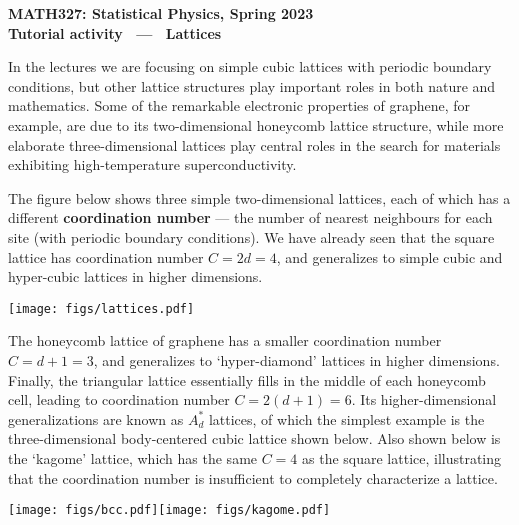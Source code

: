\documentclass[12 pt]{article} %
\begin{document}
\newcommand{\thisunit}{MATH327 Tutorial (Lattice)}
\newcommand{\moddate}{Last modified 4 May 2023}
\begin{center}
  {\Large \textbf{MATH327: Statistical Physics, Spring 2023}} \\[12 pt]
  {\Large \textbf{Tutorial activity \ --- \ Lattices}} \\[24 pt]
\end{center}

In the lectures we are focusing on simple cubic lattices with periodic boundary conditions, but other lattice structures play important roles in both nature and mathematics.
Some of the remarkable electronic properties of graphene, for example, are due to its two-dimensional honeycomb lattice structure, while more elaborate three-dimensional lattices play central roles in the search for materials exhibiting high-temperature superconductivity.

The figure below shows three simple two-dimensional lattices, each of which has a different \textbf{coordination number} --- the number of nearest neighbours for each site (with periodic boundary conditions). %
We have already seen that the square lattice has coordination number $C = 2d = 4$, and generalizes to simple cubic and hyper-cubic lattices in higher dimensions.

\begin{center}\texttt{[image: figs/lattices.pdf]}\end{center}

The honeycomb lattice of graphene has a smaller coordination number $C = d + 1 = 3$, and generalizes to `hyper-diamond' lattices in higher dimensions.
Finally, the triangular lattice essentially fills in the middle of each honeycomb cell, leading to coordination number $C = 2(d + 1) = 6$.
Its higher-dimensional generalizations are known as $A_d^*$ lattices, of which the simplest example is the three-dimensional body-centered cubic lattice shown below.
Also shown below is the `kagome' lattice, which has the same $C = 4$ as the square lattice, illustrating that the coordination number is insufficient to completely characterize a lattice.

\begin{center}\texttt{[image: figs/bcc.pdf]}\hspace{0.15\textwidth}\texttt{[image: figs/kagome.pdf]}\end{center}
\end{document}

